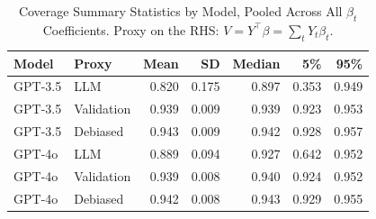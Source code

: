 \begin{table}

\caption{Coverage Summary Statistics by Model, Pooled Across All $\beta_{t}$ Coefficients. Proxy on the RHS: $V = Y^\top \beta = \sum_{t} Y_t \beta_t$.}
\centering
\begin{tabular}[t]{llrrrrr}
\toprule
Model & Proxy & Mean & SD & Median & 5\% & 95\%\\
\midrule
GPT-3.5 & LLM & 0.820 & 0.175 & 0.897 & 0.353 & 0.949\\
GPT-3.5 & Validation & 0.939 & 0.009 & 0.939 & 0.923 & 0.953\\
GPT-3.5 & Debiased & 0.943 & 0.009 & 0.942 & 0.928 & 0.957\\
GPT-4o & LLM & 0.889 & 0.094 & 0.927 & 0.642 & 0.952\\
GPT-4o & Validation & 0.939 & 0.008 & 0.940 & 0.924 & 0.952\\
GPT-4o & Debiased & 0.942 & 0.008 & 0.943 & 0.929 & 0.955\\
\bottomrule
\end{tabular}
\end{table}
